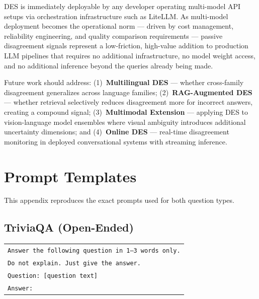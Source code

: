\documentclass[journal]{IEEEtran}
\begin{document}
DES is immediately deployable by any developer operating multi-model
API setups via orchestration infrastructure such as LiteLLM.
As multi-model deployment becomes the operational norm --- driven by cost
management, reliability engineering, and quality comparison requirements
--- passive disagreement signals represent a low-friction, high-value
addition to production LLM pipelines that requires no additional
infrastructure, no model weight access, and no additional
inference beyond the queries already being made.

Future work should address: (1)~\textbf{Multilingual DES} --- whether
cross-family disagreement generalizes across language families;
(2)~\textbf{RAG-Augmented DES} --- whether retrieval selectively reduces
disagreement more for incorrect answers, creating a compound signal;
(3)~\textbf{Multimodal Extension} --- applying DES to vision-language
model ensembles where visual ambiguity introduces additional uncertainty
dimensions; and (4)~\textbf{Online DES} --- real-time disagreement
monitoring in deployed conversational systems with streaming inference.

\appendices

\section{Prompt Templates}
\label{app:prompts}

This appendix reproduces the exact prompts used for both question types.

\subsection{TriviaQA (Open-Ended)}
\begin{center}\small\begin{tabular}{p{}}
\hline
\texttt{Answer the following question in 1--3 words only.}\\
\texttt{Do not explain. Just give the answer.}\\[4pt]
\texttt{Question: [question text]}\\[2pt]
\texttt{Answer:}\\
\hline
\end{tabular}\end{center}
\end{document}
